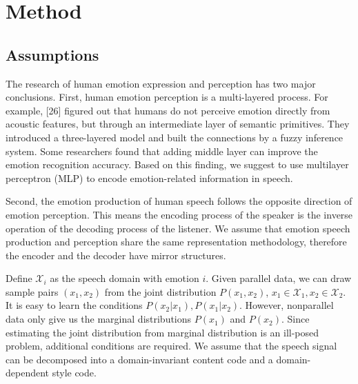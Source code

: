 \documentclass{article}
\begin{document}


\section{Method}
\label{sec:method}

\subsection{Assumptions}
The research of human emotion expression and perception has two major conclusions.
First, human emotion perception is a multi-layered process. For example, [26] figured out that humans do not perceive emotion directly from acoustic features, but through an intermediate layer of semantic primitives. They introduced a three-layered model and built the connections by a fuzzy inference system. Some researchers found that adding middle layer can improve the emotion recognition accuracy. Based on this finding, we suggest to use multilayer perceptron (MLP) to encode emotion-related information in speech.

Second, the emotion production of human speech follows the opposite direction of emotion perception. This means the encoding process of the speaker is the inverse operation of the decoding process of the listener. We assume that emotion speech production and perception share the same representation methodology, {\color{blue} therefore the encoder and the decoder have mirror structures.}

Define $\mathcal{X}_i$ as the speech domain with emotion $i$. Given parallel data, we can draw sample pairs $(x_1, x_2)$ from the joint distribution $P(x_1, x_2)$, $x_1 \in \mathcal{X}_1, x_2 \in \mathcal{X}_2$. It is easy to learn the conditions $P(x_2|x_1), P(x_1|x_2)$. However, nonparallel data only give us the marginal distributions $P(x_1)$ and $P(x_2)$. Since estimating the joint distribution from marginal distribution is an ill-posed problem, additional conditions are required. We assume that the speech signal can be decomposed into a domain-invariant content code and a domain-dependent style code.
\end{document}
